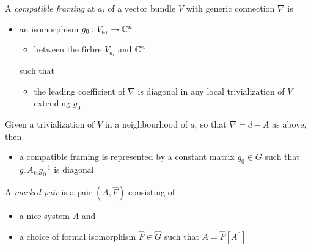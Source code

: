 \begin{paracol}{2}\sloppy
\switchcolumn[0]\noindent
  \begin{defn}
    A \emph{compatible framing} at $a_i$ of a vector bundle $V$ with generic
    connection $\nabla$ is
    \begin{itemize}
      \item an isomorphism $g_0:V_{a_i}\to\mathbb{C}^n$
        \begin{itemize}
          \item between the firbre $V_{a_i}$ and $\mathbb{C}^n$
        \end{itemize}
        such that
        \begin{itemize}
          \item the leading coefficient of $\nabla$ is diagonal in any local
            trivialization of $V$ extending $g_0$.
        \end{itemize}
    \end{itemize}
    \begin{rem}
      Given a trivialization of $V$ in a neighbourhood of $a_i$ so that
      $\nabla=d-A$ as above, then
      \begin{itemize}
        \item a compatible framing is represented by a constant matrix
          $g_0\in G$ such that $g_0A_{k_i}g_0^{-1}$ is diagonal
      \end{itemize}
    \end{rem}
  \end{defn}
\switchcolumn[1]\noindent
  \begin{defn}
    A \emph{marked pair} is a pair $(A, \hat F)$ consisting of
    \begin{itemize}
      \item a nice system $A$ and
      \item a choice of formal isomorphism $\hat F \in \hat G$ such that
        $A = \hat F[A^0]$
    \end{itemize}
  \end{defn}
\end{paracol}

